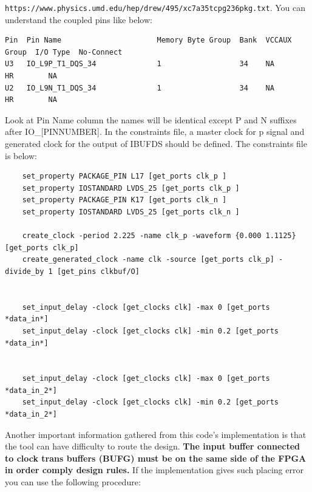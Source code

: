 \documentclass{report}
\begin{document}
\texttt{https://www.physics.umd.edu/hep/drew/495/xc7a35tcpg236pkg.txt}. You can understand the coupled pins like below:
\begin{verbatim}
Pin  Pin Name                      Memory Byte Group  Bank  VCCAUX Group  I/O Type  No-Connect
U3   IO_L9P_T1_DQS_34              1                  34    NA            HR        NA
U2   IO_L9N_T1_DQS_34              1                  34    NA            HR        NA
\end{verbatim}
Look at Pin Name column the names will be identical except P and N suffixes after IO\_[PINNUMBER].
In the constraints file, a master clock for p signal and generated clock for the output of IBUFDS should be defined. The constraints file is below:
\begin{verbatim}
    set_property PACKAGE_PIN L17 [get_ports clk_p ]                    
    set_property IOSTANDARD LVDS_25 [get_ports clk_p ]
    set_property PACKAGE_PIN K17 [get_ports clk_n ]                    
    set_property IOSTANDARD LVDS_25 [get_ports clk_n ]
    
    create_clock -period 2.225 -name clk_p -waveform {0.000 1.1125} [get_ports clk_p]
    create_generated_clock -name clk -source [get_ports clk_p] -divide_by 1 [get_pins clkbuf/O]
    
    
    set_input_delay -clock [get_clocks clk] -max 0 [get_ports *data_in*]
    set_input_delay -clock [get_clocks clk] -min 0.2 [get_ports *data_in*]
    
    
    set_input_delay -clock [get_clocks clk] -max 0 [get_ports *data_in_2*]
    set_input_delay -clock [get_clocks clk] -min 0.2 [get_ports *data_in_2*]
\end{verbatim}

Another important information gathered from this code's implementation is that the tool can have difficulty to route the design. \textbf{The input buffer connected to clock trans buffers (BUFG) must be on the same side of the FPGA in order comply design rules.} 
If the implementation gives such placing error you can use the following procedure:
\end{document}
